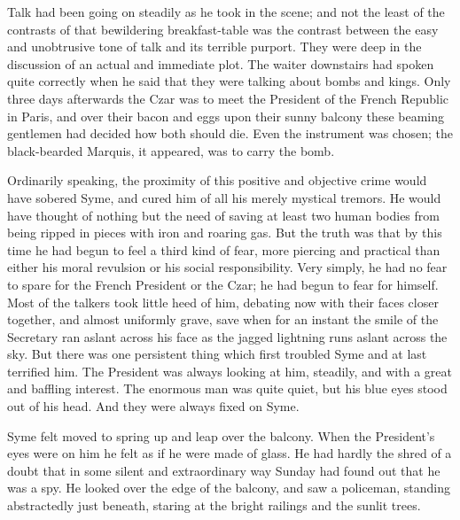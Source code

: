 Talk had been going on steadily as he took in the scene; and not the least of the contrasts of that bewildering breakfast-table was the contrast between the easy and unobtrusive tone of talk and its terrible purport. They were deep in the discussion of an actual and immediate plot. The waiter downstairs had spoken quite correctly when he said that they were talking about bombs and kings. Only three days afterwards the Czar was to meet the President of the French Republic in Paris, and over their bacon and eggs upon their sunny balcony these beaming gentlemen had decided how both should die. Even the instrument was chosen; the black-bearded Marquis, it appeared, was to carry the bomb.

Ordinarily speaking, the proximity of this positive and objective crime would have sobered Syme, and cured him of all his merely mystical tremors. He would have thought of nothing but the need of saving at least two human bodies from being ripped in pieces with iron and roaring gas. But the truth was that by this time he had begun to feel a third kind of fear, more piercing and practical than either his moral revulsion or his social responsibility. Very simply, he had no fear to spare for the French President or the Czar; he had begun to fear for himself. Most of the talkers took little heed of him, debating now with their faces closer together, and almost uniformly grave, save when for an instant the smile of the Secretary ran aslant across his face as the jagged lightning runs aslant across the sky. But there was one persistent thing which first troubled Syme and at last terrified him. The President was always looking at him, steadily, and with a great and baffling interest. The enormous man was quite quiet, but his blue eyes stood out of his head. And they were always fixed on Syme.

Syme felt moved to spring up and leap over the balcony. When the President’s eyes were on him he felt as if he were made of glass. He had hardly the shred of a doubt that in some silent and extraordinary way Sunday had found out that he was a spy. He looked over the edge of the balcony, and saw a policeman, standing abstractedly just beneath, staring at the bright railings and the sunlit trees.

